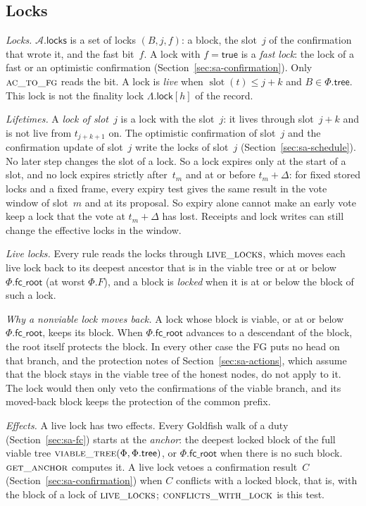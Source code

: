 \documentclass{article}
\newcommand{\slot}{\operatorname{slot}}
\newcommand{\AC}{\mathcal A}
\newcommand{\Fr}{\Phi}
\newcommand{\tree}{\mathsf{tree}}
\newcommand{\fcroot}{\mathsf{fc\_root}}
\newcommand{\filtered}{\fname{viable\_tree}}
\newcommand{\fname}[1]{\text{\textsc{#1}}}
\newcommand{\locks}{\mathsf{locks}}
\begin{document}
\subsection{Locks}\label{sec:sa-locks}

\emph{Locks.}  $\AC.\locks$ is a set of locks $(B,j,f)$: a block, the
slot~$j$ of the confirmation that wrote it, and the fast bit~$f$.  A lock with $f=\mathsf{true}$ is a
\emph{fast lock}: the lock of a fast or an optimistic confirmation
(Section~\ref{sec:sa-confirmation}).  Only $\Call{ac\_to\_fg}{}$ reads the
bit.  A lock is \emph{live} when $\slot(t)\leq j+k$ and $B\in\Fr.\tree$.  This lock
is not the finality lock $\Lambda.\mathsf{lock}[h]$ of the record.

\emph{Lifetimes.}  A \emph{lock of slot~$j$} is a lock with the slot~$j$:
it lives through slot~$j+k$ and is not live from $t_{j+k+1}$ on.  The
optimistic confirmation of slot~$j$ and the confirmation update of
slot~$j$ write the locks of slot~$j$ (Section~\ref{sec:sa-schedule}).  No
later step changes the slot of a lock.  So a lock expires only at the
start of a slot, and no lock expires strictly after~$t_m$ and at or before
$t_m+\Delta$: for fixed stored locks and a fixed frame, every expiry test
gives the same result in the vote window of slot~$m$ and at its proposal.
So expiry alone cannot make an early vote keep a lock that the vote at
$t_m+\Delta$ has lost.  Receipts and lock writes can still change the
effective locks in the window.

\emph{Live locks.}  Every rule reads the locks through
$\Call{live\_locks}{}$, which moves each live lock back to its deepest
ancestor that is in the viable tree or at or below $\Fr.\fcroot$ (at worst
$\Fr.F$), and a block is \emph{locked} when it is at or below the block of
such a lock.

\emph{Why a nonviable lock moves back.}  A lock whose block is viable,
or at or below $\Fr.\fcroot$, keeps its block.  When $\Fr.\fcroot$
advances to a descendant of the block, the root itself protects the
block.  In every other case the FG puts no head on that branch, and the
protection notes of Section~\ref{sec:sa-actions}, which assume that the
block stays in the viable tree of the honest nodes, do not apply to it.
The lock would then only veto the confirmations of the viable branch, and
its moved-back block keeps the protection of the common prefix.

\emph{Effects.}  A live lock has two effects.  Every Goldfish walk of a
duty (Section~\ref{sec:sa-fc}) starts at the \emph{anchor}: the deepest locked block of the full
viable tree $\filtered(\Fr,\Fr.\tree)$, or $\Fr.\fcroot$ when there is no
such block.  $\Call{get\_anchor}{}$ computes it.  A live lock vetoes a confirmation
result~$C$ (Section~\ref{sec:sa-confirmation}) when $C$ conflicts with a
locked block, that is, with the block of a lock of $\Call{live\_locks}{}$;
$\Call{conflicts\_with\_lock}{}$ is this test.
\end{document}
